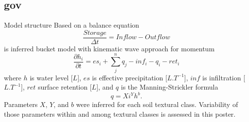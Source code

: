 \subsection{gov}
\begin{block}{Model structure}
    Based on a balance equation 
    $$
        \frac{Storage}{\Delta t} = \nonumber  
        Inflow - Outflow
    $$
    is inferred bucket model with kinematic wave approach for momentum 
    $$
        \frac{\partial h_{i}}{\partial t} =  es_{i} + \sum_j^n q_{j} - inf_{i} - q_{i} - ret_i
    $$
    where $h$ is water level [$L$], $es$ is effective precipitation [$L.T^{-1}$], $inf$ is infiltration [$L.T^{-1}$], $ret$ surface retention [$L$], and $q$ is the Manning-Strickler formula
    $$
      q = Xi^Yh^b. 
    $$
    Parameters $X$, $Y$, and $b$ were inferred for each soil textural class. Variability of those parameters within and among textural classes is assessed in this poster. 
\end{block}





